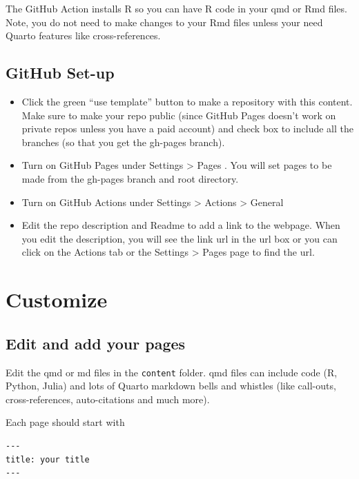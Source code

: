 \documentclass[
  letterpaper,
  oneside,
  open=any]{scrbook}
\begin{document}
The GitHub Action installs R so you can have R code in your qmd or Rmd
files. Note, you do not need to make changes to your Rmd files unless
your need Quarto features like cross-references.

\section{GitHub Set-up}\label{github-set-up}

\begin{itemize}
\item
  Click the green ``use template'' button to make a repository with this
  content. Make sure to make your repo public (since GitHub Pages
  doesn't work on private repos unless you have a paid account) and
  check box to include all the branches (so that you get the gh-pages
  branch).
\item
  Turn on GitHub Pages under Settings \textgreater{} Pages . You will
  set pages to be made from the gh-pages branch and root directory.
\item
  Turn on GitHub Actions under Settings \textgreater{} Actions
  \textgreater{} General
\item
  Edit the repo description and Readme to add a link to the webpage.
  When you edit the description, you will see the link url in the url
  box or you can click on the Actions tab or the Settings \textgreater{}
  Pages page to find the url.
\end{itemize}


\chapter{Customize}\label{customize}

\section{Edit and add your pages}\label{edit-and-add-your-pages}

Edit the qmd or md files in the \texttt{content} folder. qmd files can
include code (R, Python, Julia) and lots of Quarto markdown bells and
whistles (like call-outs, cross-references, auto-citations and much
more).

Each page should start with

\begin{verbatim}
---
title: your title
---
\end{verbatim}
\end{document}
